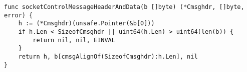 \begin{lstlisting}[language=Golang, label=lst:labels-classexample-conversion-struct-byteslice, caption=Usage class example: conversion-struct-byteslice]
func socketControlMessageHeaderAndData(b []byte) (*Cmsghdr, []byte, error) {
    h := (*Cmsghdr)(unsafe.Pointer(&b[0]))
    if h.Len < SizeofCmsghdr || uint64(h.Len) > uint64(len(b)) {
        return nil, nil, EINVAL
    }
    return h, b[cmsgAlignOf(SizeofCmsghdr):h.Len], nil
}
\end{lstlisting}